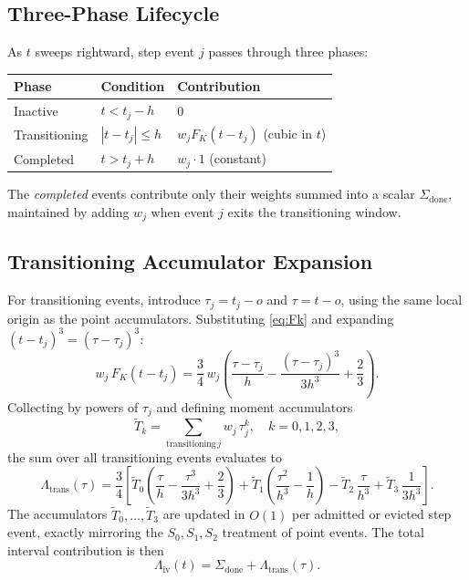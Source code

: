 \documentclass[11pt,a4paper]{article}
\newcommand{\h}{h}                   %
\begin{document}
\subsection{Three-Phase Lifecycle}

As $t$ sweeps rightward, step event $j$ passes through three phases:
\begin{center}
\begin{tabular}{lll}
\hline
Phase & Condition & Contribution \\
\hline
Inactive    & $t < t_j - \h$ & $0$ \\
Transitioning & $|t - t_j| \le \h$ & $w_j F_K(t-t_j)$ \quad (cubic in $t$) \\
Completed   & $t > t_j + \h$ & $w_j \cdot 1$ \quad (constant) \\
\hline
\end{tabular}
\end{center}
The \emph{completed} events contribute only their weights summed into a scalar
$\Sigma_{\mathrm{done}}$, maintained by adding $w_j$ when event $j$ exits the
transitioning window.

\subsection{Transitioning Accumulator Expansion}
\label{sec:tkAccum}

For transitioning events, introduce $\tau_j = t_j - o$ and
$\tau = t - o$, using the same local origin as the point accumulators.
Substituting \eqref{eq:Fk} and expanding
$(t - t_j)^3 = (\tau - \tau_j)^3$:
\begin{equation}
  w_j\,F_K(t-t_j)
  = \frac{3}{4}\, w_j \!\left(\frac{\tau - \tau_j}{\h}
      - \frac{(\tau-\tau_j)^3}{3\h^3} + \frac{2}{3}\right).
\end{equation}
Collecting by powers of $\tau_j$ and defining moment accumulators
\begin{equation}
  \tilde T_k = \sum_{\text{transitioning}\,j} w_j\,\tau_j^k,
  \quad k = 0,1,2,3,
  \label{eq:Tk}
\end{equation}
the sum over all transitioning events evaluates to
\begin{equation}
  \Lambda_{\mathrm{trans}}(\tau)
  = \frac{3}{4}\!\left[
      \tilde T_0\!\left(\frac{\tau}{\h} - \frac{\tau^3}{3\h^3} + \frac{2}{3}\right)
    + \tilde T_1\!\left(\frac{\tau^2}{\h^3} - \frac{1}{\h}\right)
    - \tilde T_2\,\frac{\tau}{\h^3}
    + \tilde T_3\,\frac{1}{3\h^3}
  \right].
  \label{eq:transTerm}
\end{equation}
The accumulators $\tilde T_0,\ldots,\tilde T_3$ are updated in $O(1)$ per
admitted or evicted step event, exactly mirroring the $S_0,S_1,S_2$ treatment
of point events.  The total interval contribution is then
\begin{equation}
  \Lambda_{\mathrm{iv}}(t) = \Sigma_{\mathrm{done}} + \Lambda_{\mathrm{trans}}(\tau).
\end{equation}
\end{document}
